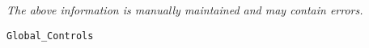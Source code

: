 \label{pkg:global\_controls}

{\tiny \it The above information is manually maintained and may contain errors.}
\begin{verbatim}
Global_Controls
\end{verbatim}
